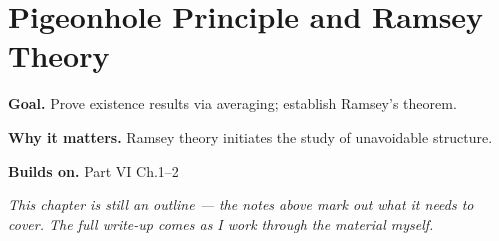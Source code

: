 \chapter{Pigeonhole Principle and Ramsey Theory}
\label{ch:06-combinatorics-and-graph-theory-05}

\begin{chapterintro}
\textbf{Goal.} Prove existence results via averaging; establish Ramsey's theorem.

\textbf{Why it matters.} Ramsey theory initiates the study of unavoidable structure.

\textbf{Builds on.} Part VI Ch.1–2
\end{chapterintro}

\textit{This chapter is still an outline --- the notes above mark out what it needs to cover. The full write-up comes as I work through the material myself.}
